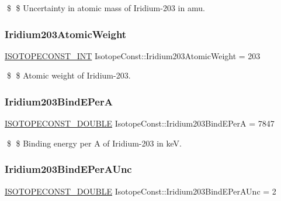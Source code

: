 \$ \$ Uncertainty in atomic mass of Iridium-\/203 in amu. \mbox{\label{group___isotope_const-_iridium-_ir203_gafc3aa42ce1d4dafe5dd6783132e7a1ec}} 
\subsubsection{\texorpdfstring{Iridium203\+Atomic\+Weight}{Iridium203AtomicWeight}}
{\footnotesize\ttfamily \mbox{\hyperlink{group___isotope_const-_macros_ga5f18360b3e99483a35c32d789e62621c}{I\+S\+O\+T\+O\+P\+E\+C\+O\+N\+S\+T\+\_\+\+I\+NT}} Isotope\+Const\+::\+Iridium203\+Atomic\+Weight = 203}

\$ \$ Atomic weight of Iridium-\/203. \mbox{\label{group___isotope_const-_iridium-_ir203_gac24e9e6d7fcadedd813554593f83cd5f}} 
\subsubsection{\texorpdfstring{Iridium203\+Bind\+E\+PerA}{Iridium203BindEPerA}}
{\footnotesize\ttfamily \mbox{\hyperlink{group___isotope_const-_macros_ga8f45a7272ce02c0b4c65c44636ed719a}{I\+S\+O\+T\+O\+P\+E\+C\+O\+N\+S\+T\+\_\+\+D\+O\+U\+B\+LE}} Isotope\+Const\+::\+Iridium203\+Bind\+E\+PerA = 7847}

\$ \$ Binding energy per A of Iridium-\/203 in keV. \mbox{\label{group___isotope_const-_iridium-_ir203_ga6c5af186b5cc362134aaeace6c26acb3}} 
\subsubsection{\texorpdfstring{Iridium203\+Bind\+E\+Per\+A\+Unc}{Iridium203BindEPerAUnc}}
{\footnotesize\ttfamily \mbox{\hyperlink{group___isotope_const-_macros_ga8f45a7272ce02c0b4c65c44636ed719a}{I\+S\+O\+T\+O\+P\+E\+C\+O\+N\+S\+T\+\_\+\+D\+O\+U\+B\+LE}} Isotope\+Const\+::\+Iridium203\+Bind\+E\+Per\+A\+Unc = 2}

